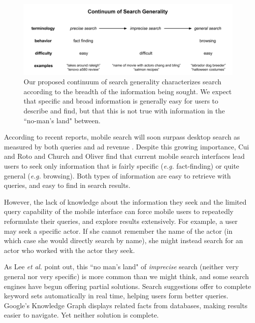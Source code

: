 \begin{figure}[ht]
\centering
\includegraphics[width=\textwidth]{images/terminologydiagram}
\caption{ Our proposed continuum of search generality characterizes search according to the breadth of the information being sought. We expect that specific and broad information is generally easy for users to describe and find, but that this is not true with information in the ``no-man's land" between.}
\label{fig:searchcontinuum}
\end{figure}




According to recent reports, mobile search will soon surpass desktop search as measured by both queries and ad revenue \cite{MobileQueries}\cite{MobileRevenue}. Despite this growing importance, Cui and Roto \cite{Cui:2008} and Church and Oliver \cite{Church:2011} find that current mobile search interfaces lead users to seek only information that is fairly specific (\textit{e.g.} fact-finding) or quite general (\textit{e.g.} browsing). Both types of information are easy to retrieve with queries, and easy to find in search results.

However, the lack of knowledge about the information they seek and the limited query capability of the mobile interface \cite{Kamvar:2009} can force mobile users to repeatedly reformulate their queries, and explore results extensively. For example, a user may seek a specific actor. If she cannot remember the name of the actor (in which case she would directly search by name), she might instead search for an actor who worked with the actor they seek. 

As Lee \textit{et al.} \cite{Lee:2012} point out, this ``no man's land" of \textit{imprecise} search (neither very general nor very specific) is more common than we might think, and some search engines have begun offering partial solutions. Search suggestions offer to complete keyword sets automatically in real time, helping users form better queries. Google's Knowledge Graph \cite{GoogleKnowledgeGraph} displays related facts from databases, making results easier to navigate. Yet neither solution is complete.

